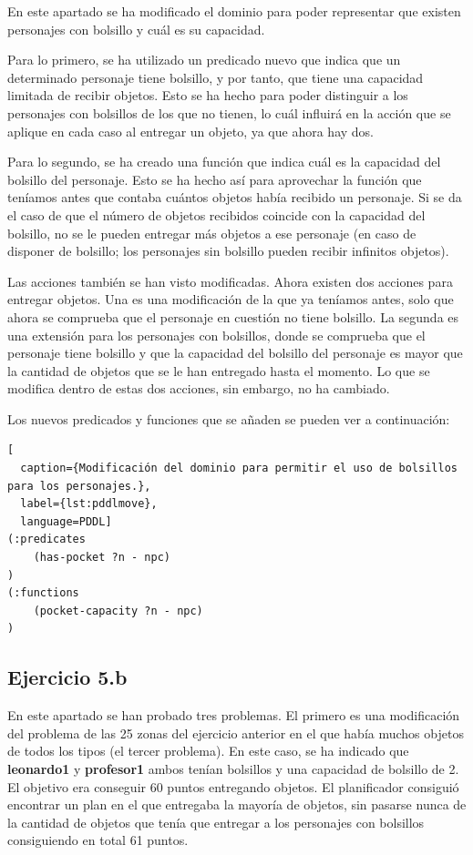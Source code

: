 \documentclass[11pt,a4paper]{article}
\begin{document}
En este apartado se ha modificado el dominio para poder representar que existen personajes con bolsillo y cuál es su capacidad.

Para lo primero, se ha utilizado un predicado nuevo que indica que un determinado personaje tiene bolsillo, y por tanto, que tiene
una capacidad limitada de recibir objetos. Esto se ha hecho para poder distinguir a los personajes con bolsillos de los que
no tienen, lo cuál influirá en la acción que se aplique en cada caso al entregar un objeto, ya que ahora hay dos.

Para lo segundo, se ha creado una función que indica cuál es la capacidad del bolsillo del personaje. Esto se ha hecho así para
aprovechar la función que teníamos antes que contaba cuántos objetos había recibido un personaje. Si se da el caso de que el
número de objetos recibidos coincide con la capacidad del bolsillo, no se le pueden entregar más objetos a ese personaje (en caso
de disponer de bolsillo; los personajes sin bolsillo pueden recibir infinitos objetos).

Las acciones también se han visto modificadas. Ahora existen dos acciones para entregar objetos. Una es una modificación de la que
ya teníamos antes, solo que ahora se comprueba que el personaje en cuestión no tiene bolsillo. La segunda es una extensión para los
personajes con bolsillos, donde se comprueba que el personaje tiene bolsillo y que la capacidad del bolsillo del personaje es mayor
que la cantidad de objetos que se le han entregado hasta el momento. Lo que se modifica dentro de estas dos acciones, sin embargo,
no ha cambiado.

Los nuevos predicados y funciones que se añaden se pueden ver a continuación: 

\begin{algorithm}[H]
\begin{lstlisting}[
  caption={Modificación del dominio para permitir el uso de bolsillos para los personajes.},
  label={lst:pddlmove},
  language=PDDL]
(:predicates
	(has-pocket ?n - npc)
)
(:functions
    (pocket-capacity ?n - npc)
)
\end{lstlisting}
\end{algorithm}

\subsection{Ejercicio 5.b}

En este apartado se han probado tres problemas. El primero es una modificación del problema de las 25 zonas del ejercicio anterior
en el que había muchos objetos de todos los tipos (el tercer problema). En este caso, se ha indicado que \textbf{leonardo1} y
\textbf{profesor1} ambos tenían bolsillos y una capacidad de bolsillo de 2. El objetivo era conseguir 60 puntos entregando objetos.
El planificador consiguió encontrar un plan en el que entregaba la mayoría de objetos, sin pasarse nunca de la cantidad de objetos
que tenía que entregar a los personajes con bolsillos consiguiendo en total 61 puntos.
\end{document}
